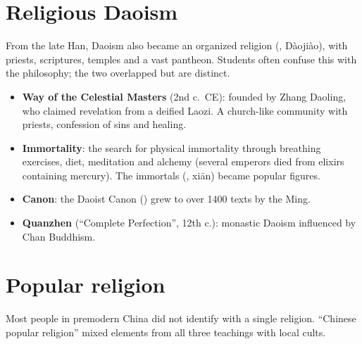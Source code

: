 \section{Religious Daoism}

From the late Han, Daoism also became an organized religion (, Dàojiào), with
priests, scriptures, temples and a vast pantheon. Students often confuse this with the
philosophy; the two overlapped but are distinct.

\begin{itemize}
  \item \textbf{Way of the Celestial Masters} (2nd c.\ CE): founded by Zhang Daoling, who
        claimed revelation from a deified Laozi. A church-like community with priests,
        confession of sins and healing.
  \item \textbf{Immortality}: the search for physical immortality through breathing
        exercises, diet, meditation and alchemy (several emperors died from elixirs
        containing mercury). The immortals (, xiān) became popular figures.
  \item \textbf{Canon}: the Daoist Canon () grew to over 1400 texts by the Ming.
  \item \textbf{Quanzhen} (``Complete Perfection'', 12th c.): monastic Daoism influenced by
        Chan Buddhism.
\end{itemize}

\section{Popular religion}

Most people in premodern China did not identify with a single religion. ``Chinese popular
religion'' mixed elements from all three teachings with local cults.

\begin{center}
\end{center}

